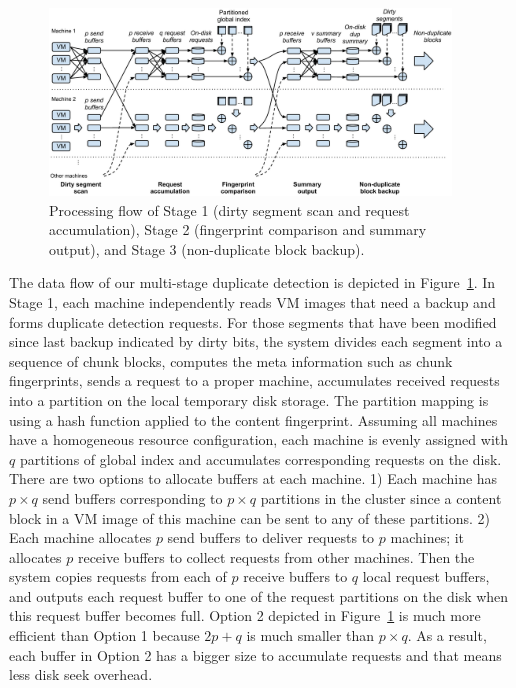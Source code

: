 \begin{figure}[tbhp]
\centering

\includegraphics[width=0.95\textwidth]{steps.pdf}
\caption{Processing flow of Stage  1 (dirty segment scan and request accumulation), Stage 2 
(fingerprint comparison and summary output),  and Stage 3 (non-duplicate block backup).}
\label{fig:flow}
\end{figure}

The data flow of our multi-stage duplicate detection is depicted in Figure~\ref{fig:flow}. 
In Stage 1, each machine independently reads  
VM images that need a backup
and forms duplicate  detection requests. For those segments that have been modified since last backup indicated by 
dirty bits,  the system divides  each segment into a sequence of chunk blocks,  computes the meta 
information such as chunk fingerprints,  sends a request to a proper machine, accumulates  
received requests into a partition on the local temporary disk storage. 
The partition mapping is using a hash function applied to the content fingerprint. 
Assuming all machines have a  homogeneous resource configuration, each machine is evenly  assigned with
$q$ partitions of global index and accumulates corresponding requests on the disk. 
There are two options to allocate buffers at each machine. 
1) Each machine has  $p\times q$ send buffers corresponding to $p\times q$ partitions in the cluster
since a content block in a VM image of this machine can be sent to any of these partitions.
2) Each machine allocates $p$ send buffers to deliver requests to $p$ machines; it allocates 
$p$ receive buffers to collect requests  from other machines.
Then the system copies requests from each of $p$ receive buffers to  $q$ local request buffers,
and outputs each request buffer to one of the request partitions on the disk
when this request buffer becomes full.  Option 2 depicted in Figure~\ref{fig:flow}
is much more efficient than Option 1 because $2p+q$ is much smaller than
$p\times q$. As a result, each buffer in Option 2 has a bigger size to accumulate requests and that means
less disk seek overhead.

